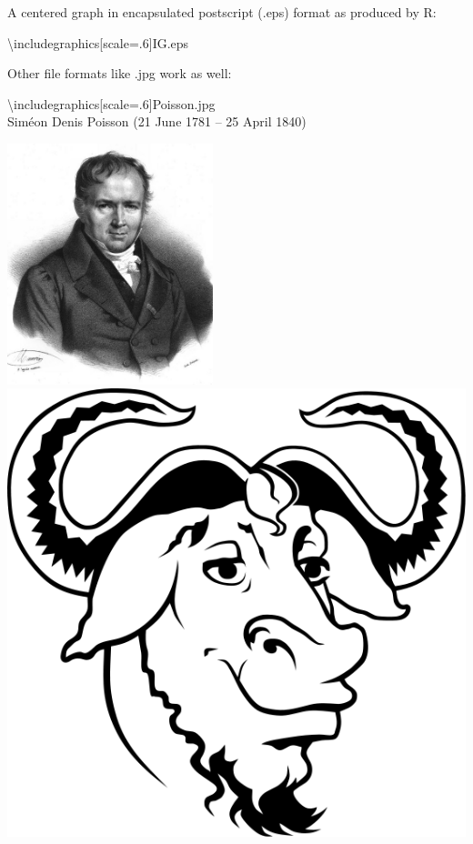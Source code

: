 \documentclass[11pt]{article}
\begin{document}

A centered graph in encapsulated postscript (.eps) format as produced by R:

\begin{center}
\textbackslash{}includegraphics[scale=.6]{IG.eps} 
\end{center}

Other file formats like .jpg work as well:

\begin{center}
\textbackslash{}includegraphics[scale=.6]{Poisson.jpg}
\\
Sim\'eon Denis Poisson (21 June 1781 -- 25 April 1840)
\end{center}

\bigskip

\includegraphics[height=7cm]{Poisson.jpg}
\includegraphics[scale=.4]{GNU.png}
\end{document}
